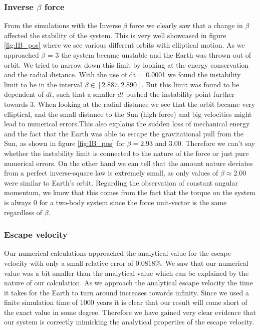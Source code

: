 \documentclass[american,a4paper,12pt]{article}
\begin{document}
\subsubsection{Inverse $\beta$ force}
From the simulations with the Inverse $\beta$ force we clearly saw that a change in $\beta$ affected the stability of the system. This is very well showcased in figure \ref{fig:IB_pos} where we see various different orbits with elliptical motion. As we approached $\beta$ = 3 the system became unstable and the Earth was thrown out of orbit. We tried to narrow down this limit by looking at the energy conservation and the radial distance. With the use of dt = 0.0001 we found the instability limit to be in the interval $\beta \in [2.887, 2.890]$. But this limit was found to be dependent of $dt$, such that a smaller $dt$ pushed the instability point further towards 3. When looking at the radial distance we see that the orbit became very elliptical, and the small distance to the Sun (high force) and big velocities might lead to numerical errors.\newpage This also explains the sudden loss of mechanical energy and the fact that the Earth was able to escape the gravitational pull from the Sun, as shown in figure \ref{fig:IB_pos} for $\beta = 2.93$ and 3.00. Therefore we can't say whether the instability limit is connected to the nature of the force or just pure numerical errors. On the other hand we can tell that the amount nature deviates from a perfect inverse-square law is extremely small, as only values of $\beta \approx 2.00$ were similar to Earth's orbit. Regarding the observation of constant angular momentum, we know that this comes from the fact that the torque on the system is always $0$ for a two-body system since the force unit-vector is the same regardless of $\beta$.

\subsubsection{Escape velocity}
Our numerical calculations approached the analytical value for the escape velocity with only a small relative error of $0.0818 \%$. We saw that our numerical value was a bit smaller than the analytical value which can be explained by the nature of our calculation. As we approach the analytical escape velocity the time it takes for the Earth to turn around increases towards infinity. Since we used a finite simulation time of 1000 years it is clear that our result will come short of the exact value in some degree. Therefore we have gained very clear evidence that our system is correctly mimicking the analytical properties of the escape velocity.  
\end{document}
